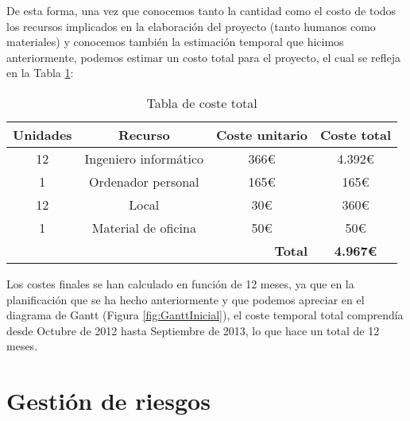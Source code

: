 De esta forma, una vez que conocemos tanto la cantidad como el costo de todos
los recursos implicados en la elaboración del proyecto (tanto humanos como
materiales) y conocemos también la estimación temporal que hicimos
anteriormente, podemos estimar un costo total para el proyecto, el cual se
refleja en la Tabla \ref{tab:costetotal}:

\begin{table}[H]
    \begin{center}
        \begin{tabular}{||c|c|c|c||}
            \hline
            \hline
            \textbf{Unidades} & \textbf{Recurso} & \textbf{Coste unitario} & \textbf{Coste total} \\
            \hline
            \hline
            12 & Ingeniero informático & 366\euro & 4.392\euro \\
            \hline
            1 & Ordenador personal & 165\euro & 165\euro \\
            \hline
            12 & Local & 30\euro & 360\euro \\
            \hline
            1 & Material de oficina & 50\euro & 50\euro \\
            \hline
            \multicolumn{3}{||r|}{\textbf{Total}} & \textbf{4.967\euro} \\
            \hline
            \hline
        \end{tabular}
    \end{center}
    \caption{Tabla de coste total}
    \label{tab:costetotal}
\end{table}

Los costes finales se han calculado en función de 12 meses, ya que en la
planificación que se ha hecho anteriormente y que podemos apreciar en el
diagrama de Gantt (Figura \ref{fig:GanttInicial}), el coste temporal total
comprendía desde Octubre de 2012 hasta Septiembre de 2013, lo que hace un total
de 12 meses.

\section{Gestión de riesgos}

